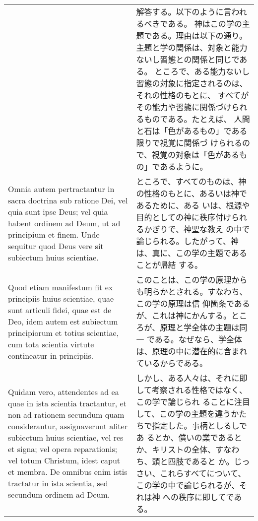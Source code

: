\documentclass[10pt]{jsarticle} %
\begin{document}
\begin{longtable}{p{21em}p{21em}}
&

解答する。以下のように言われるべきである。
神はこの学の主題である。理由は以下の通り。
主題と学の関係は、対象と能力ないし習態との関係と同じである。
ところで、ある能力ないし習態の対象に指定されるのは、それの性格のもとに、
 すべてがその能力や習態に関係づけられるものである。たとえば、
人間と石は「色があるもの」である限りで視覚に関係づ
 けられるので、視覚の対象は「色があるもの」であるように。


\\


Omnia autem pertractantur in sacra doctrina sub ratione Dei, vel
quia sunt ipse Deus; vel quia habent ordinem ad Deum, ut ad principium
et finem. Unde sequitur quod Deus vere sit subiectum huius
scientiae. 




&

ところで、すべてのものは、神の性格のもとに、あるいは神であるために、ある
 いは、根源や目的としての神に秩序付けられるかぎりで、神聖な教え
 の中で論じられる。したがって、神は、真に、この学の主題であることが帰結
 する。



\\

Quod etiam manifestum fit ex principiis huius scientiae, quae
sunt articuli fidei, quae est de Deo, idem autem est subiectum
principiorum et totius scientiae, cum tota scientia virtute contineatur
in principiis. 


&

このことは、この学の原理からも明らかとされる。すなわち、この学の原理は信
 仰箇条であるが、これは神にかんする。ところが、原理と学全体の主題は同一
 である。なぜなら、学全体は、原理の中に潜在的に含まれているからである。


\\

Quidam vero, attendentes ad ea quae in ista scientia
tractantur, et non ad rationem secundum quam considerantur,
assignaverunt aliter subiectum huius scientiae, vel res et signa; vel
opera reparationis; vel totum Christum, idest caput et membra. De
omnibus enim istis tractatur in ista scientia, sed secundum ordinem ad
Deum.


&

しかし、ある人々は、それに即して考察される性格ではなく、この学で論じられ
 ることに注目して、この学の主題を違うかたちで指定した。事柄としるしであ
 るとか、償いの業であるとか、キリストの全体、すなわち、頭と四肢であると
 か。じっさい、これらすべてについて、この学の中で論じられるが、それは神
 への秩序に即してである。



\end{longtable}
\end{document}
